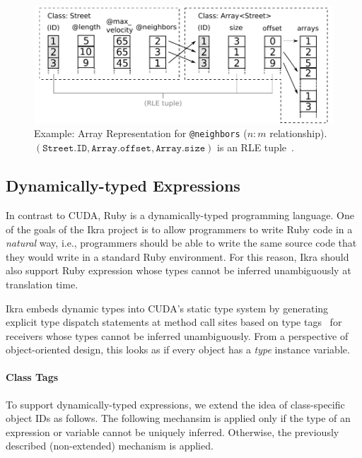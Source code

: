 \documentclass[preprint]{sigplanconf}
\begin{document}
\begin{figure}[!htp]
    \centering
    \includegraphics[width=\columnwidth]{column_access.pdf}
    \caption{Example: Array Representation for \texttt{@neighbors} ($n:m$ relationship). $(\texttt{Street.ID}, \texttt{Array.offset}, \texttt{Array.size})$ is an RLE tuple~\cite{Abadi:2006:ICE:1142473.1142548}.}
    \label{fig:array_repr}
\end{figure}



\subsection{Dynamically-typed Expressions}
\label{sec:polymorphic}
In contrast to CUDA, Ruby is a dynamically-typed programming language. One of the goals of the Ikra project is to allow programmers to write Ruby code in a \emph{natural} way, i.e., programmers should be able to write the same source code that they would write in a standard Ruby environment. For this reason, Ikra should also support Ruby expression whose types cannot be inferred unambiguously at translation time.

Ikra embeds dynamic types into CUDA's static type system by generating explicit type dispatch statements at method call sites based on type tags~\cite{Abadi:1989:DTS:75277.75296} for receivers whose types cannot be inferred unambiguously. From a perspective of object-oriented design, this looks as if every object has a \emph{type} instance variable.

\paragraph{Class Tags}
To support dynamically-typed expressions, we extend the idea of class-specific object IDs as follows. The following mechansim is applied only if the type of an expression or variable cannot be uniquely inferred. Otherwise, the previously described (non-extended) mechanism is applied. 
\end{document}
